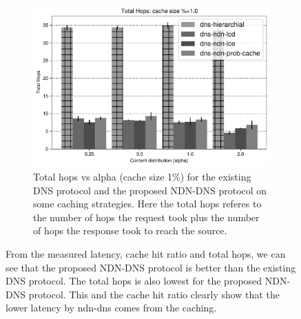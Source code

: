 \documentclass[conference]{IEEEtran}
\begin{document}
\begin{figure}[htbp]
\begin{subfigure}[b]{\linewidth}
        \centering
        \includegraphics[width=0.85\linewidth]{images/TOTAL_HOPS_C=0.01.pdf}
        \caption{Total hops vs alpha (cache size 1\%) for the existing DNS protocol and the proposed NDN-DNS protocol on some caching strategies. Here the total hops referes to the number of hops the request took plus the number of hops the response took to reach the source.}
    \end{subfigure}
    \caption{From the measured latency, cache hit ratio and total hops, we can see that the proposed NDN-DNS protocol is better than the existing DNS protocol. The total hops is also lowest for the proposed NDN-DNS protocol. This and the cache hit ratio clearly show that the lower latency by ndn-dns comes from the caching.}
    \label{fig:icarus-c0.01}
\end{figure}
\end{document}
